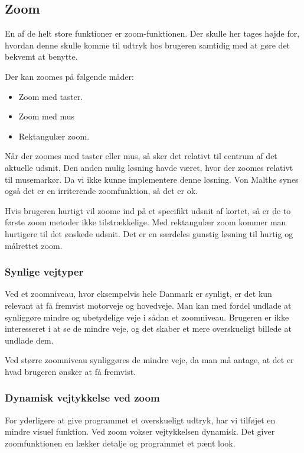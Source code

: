 \subsection{Zoom}
En af de helt store funktioner er zoom-funktionen. Der skulle her tages højde for, hvordan denne skulle komme til udtryk hos brugeren samtidig med at gøre det bekvemt at benytte.  

Der kan zoomes på følgende måder:

\begin{itemize}
	\item Zoom med taster.
	\item Zoom med mus
	\item Rektangulær zoom.
\end{itemize}

Når der zoomes med taster eller mus, så sker det relativt til centrum af det aktuelle udsnit. Den anden mulig løsning havde været, hvor der zoomes relativt til musemarkør. Da vi ikke kunne implementere denne løsning. Von Malthe synes også det er en irriterende zoomfunktion, så det er ok.

Hvis brugeren hurtigt vil zoome ind på et specifikt udsnit af kortet, så er de to første zoom metoder ikke tilstrækkelige. Med rektangulær zoom kommer man hurtigere til det ønskede udsnit. Det er en særdeles gunstig løsning til hurtig og målrettet zoom. 

\subsubsection{Synlige vejtyper}

Ved et zoomniveau, hvor eksempelvis hele Danmark er synligt, er det kun relevant at få fremvist motorveje og hovedveje. Man kan med fordel undlade at synliggøre mindre og ubetydelige veje i sådan et zoomniveau. Brugeren er ikke interesseret i at se de mindre veje, og det skaber et mere overskueligt billede at undlade dem.

Ved større zoomniveau synliggøres de mindre veje, da man må antage, at det er hvad brugeren ønsker at få fremvist.   

\subsubsection{Dynamisk vejtykkelse ved zoom}

For yderligere at give programmet et overskueligt udtryk, har vi tilføjet en mindre visuel funktion. Ved zoom vokser vejtykkelsen dynamisk. Det giver zoomfunktionen en lækker detalje og programmet et pænt look. 
  

